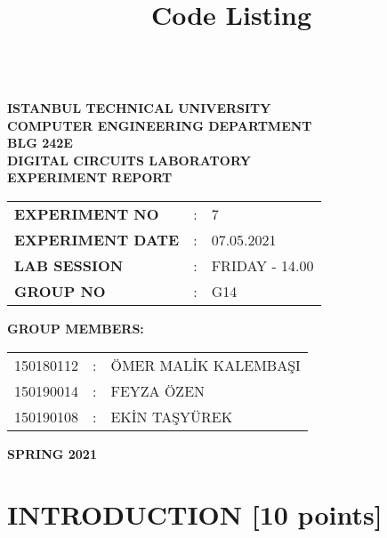 \documentclass[pdftex,12pt,a4paper]{article}
\title{Code Listing}
\begin{document}
\begin{titlepage}
\begin{center}
\textbf{}\\
\textbf{\Large{ISTANBUL TECHNICAL UNIVERSITY}}\\
\vspace{0.5cm}
\textbf{\Large{COMPUTER ENGINEERING DEPARTMENT}}\\
\vspace{2cm}
\textbf{\Large{BLG 242E\\ DIGITAL CIRCUITS LABORATORY\\ EXPERIMENT REPORT}}\\
\vspace{2.8cm}
\begin{table}[ht]
\centering
\Large{
\begin{tabular}{lcl}
\textbf{EXPERIMENT NO}  & : & 7 \\
\textbf{EXPERIMENT DATE}  & : & 07.05.2021 \\
\textbf{LAB SESSION}  & : & FRIDAY - 14.00 \\
\textbf{GROUP NO}  & : & G14 \\
\end{tabular}}
\end{table}
\vspace{1cm}
\textbf{\Large{GROUP MEMBERS:}}\\
\begin{table}[ht]
\centering
\Large{
\begin{tabular}{rcl}
150180112  & : & ÖMER MALİK KALEMBAŞI \\
150190014  & : & FEYZA ÖZEN \\
150190108  & : & EKİN TAŞYÜREK \\
\end{tabular}}
\end{table}
\vspace{2.8cm}
\textbf{\Large{SPRING 2021}}

\end{center}

\end{titlepage}

\thispagestyle{empty}
\setcounter{tocdepth}{4}
\tableofcontents
\clearpage

\setcounter{page}{1}

\section{INTRODUCTION [10 points]}
\end{document}
